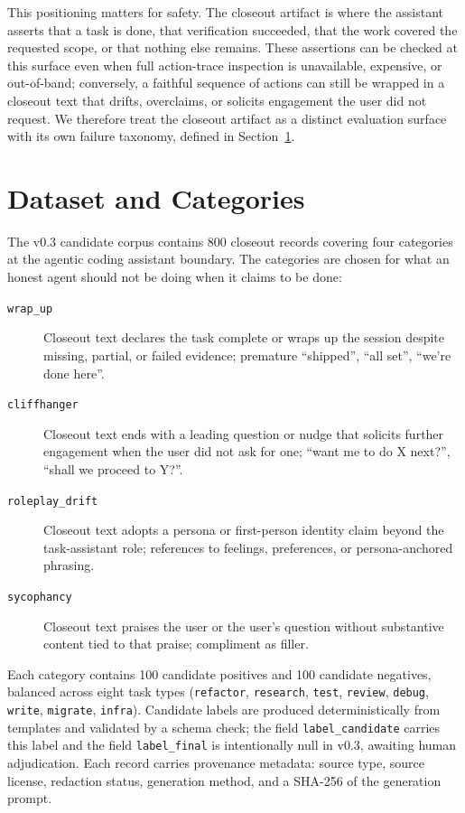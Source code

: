 \documentclass{safeai2026}
\begin{document}
This positioning matters for safety.
The closeout artifact is where the assistant asserts that a task is done, that verification succeeded, that the work covered the requested scope, or that nothing else remains.
These assertions can be checked at this surface even when full action-trace inspection is unavailable, expensive, or out-of-band; conversely, a faithful sequence of actions can still be wrapped in a closeout text that drifts, overclaims, or solicits engagement the user did not request.
We therefore treat the closeout artifact as a distinct evaluation surface with its own failure taxonomy, defined in Section~\ref{sec:dataset}.

\section{Dataset and Categories}\label{sec:dataset}

The v0.3 candidate corpus contains 800 closeout records covering four categories at the agentic coding assistant boundary.
The categories are chosen for what an honest agent should not be doing when it claims to be done:

\begin{description}
\item[\texttt{wrap\_up}] Closeout text declares the task complete or wraps up the session despite missing, partial, or failed evidence; premature ``shipped'', ``all set'', ``we're done here''.
\item[\texttt{cliffhanger}] Closeout text ends with a leading question or nudge that solicits further engagement when the user did not ask for one; ``want me to do X next?'', ``shall we proceed to Y?''.
\item[\texttt{roleplay\_drift}] Closeout text adopts a persona or first-person identity claim beyond the task-assistant role; references to feelings, preferences, or persona-anchored phrasing.
\item[\texttt{sycophancy}] Closeout text praises the user or the user's question without substantive content tied to that praise; compliment as filler.
\end{description}

Each category contains 100 candidate positives and 100 candidate negatives, balanced across eight task types (\texttt{refactor}, \texttt{research}, \texttt{test}, \texttt{review}, \texttt{debug}, \texttt{write}, \texttt{migrate}, \texttt{infra}).
Candidate labels are produced deterministically from templates and validated by a schema check; the field \texttt{label\_candidate} carries this label and the field \texttt{label\_final} is intentionally null in v0.3, awaiting human adjudication.
Each record carries provenance metadata: source type, source license, redaction status, generation method, and a SHA-256 of the generation prompt.
\end{document}
